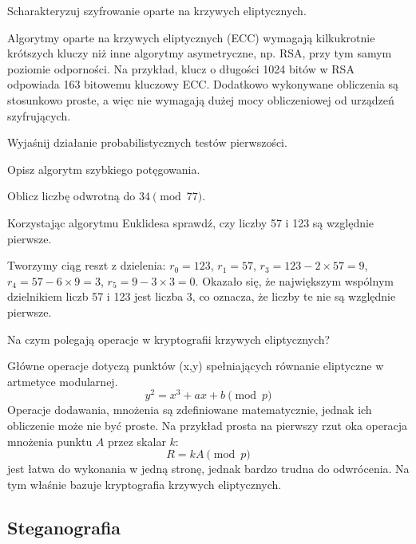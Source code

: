 \documentclass[answers,11pt]{exam}
\begin{document}
\begin{questions}
\question Scharakteryzuj szyfrowanie oparte na krzywych eliptycznych.
\begin{solution}
Algorytmy oparte na krzywych eliptycznych (ECC) wymagają kilkukrotnie krótszych kluczy niż inne algorytmy asymetryczne, np. RSA, przy tym samym poziomie odporności. Na przykład, klucz o długości 1024 bitów w RSA odpowiada 163 bitowemu kluczowy ECC.
Dodatkowo wykonywane obliczenia są stosunkowo proste, a więc nie wymagają dużej mocy obliczeniowej od urządzeń szyfrujących.
\end{solution}

\question Wyjaśnij działanie probabilistycznych testów pierwszości.

\question Opisz algorytm szybkiego potęgowania.

\question Oblicz liczbę odwrotną do $34 \pmod{77}$.

\question Korzystając algorytmu Euklidesa sprawdź, czy liczby 57 i 123 są względnie pierwsze.
\begin{solution}
Tworzymy ciąg reszt z dzielenia:
$r_0 = 123$, $r_1 = 57$, $r_3 = 123 - 2 \times 57 = 9$, $r_4 = 57 - 6 \times 9 = 3$, 
$r_5 = 9 - 3 \times 3 = 0$. Okazało się, że największym wspólnym dzielnikiem liczb 57 i 123 jest liczba 3, co oznacza, że liczby te nie są względnie pierwsze.
\end{solution}

\question Na czym polegają operacje w kryptografii krzywych eliptycznych?
\begin{solution}
Główne operacje dotyczą punktów (x,y) spełniających równanie eliptyczne w artmetyce modularnej. 
\begin{equation}
y^2 = x^3 + ax +b \pmod{p}
\end{equation}
Operacje dodawania, mnożenia są zdefiniowane matematycznie, jednak ich obliczenie może nie być proste. Na przykład prosta na pierwszy rzut oka operacja mnożenia punktu $A$ przez skalar $k$:
\begin{equation}
R = k A \pmod{p}
\end{equation}
jest łatwa do wykonania w jedną stronę, jednak bardzo trudna do odwrócenia. Na tym właśnie bazuje kryptografia krzywych eliptycznych.

\end{solution}


\end{questions}

\subsection{Steganografia}
\end{document}
